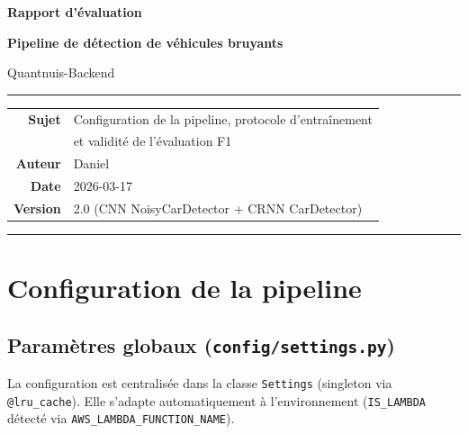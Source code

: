 \documentclass[11pt,a4paper]{article}
\newcommand{\file}[1]{\texttt{\small #1}}
\newcommand{\param}[1]{\texttt{#1}}
\begin{document}
\begin{titlepage}
\centering
\vspace*{3cm}
{\Huge\bfseries\color{sectioncolor} Rapport d'évaluation\par}
\vspace{0.5cm}
{\Large\bfseries Pipeline de détection de véhicules bruyants\par}
\vspace{0.4cm}
{\large\color{accentblue} Quantnuis-Backend\par}
\vspace{2cm}
\rule{0.6\linewidth}{0.8pt}
\vspace{0.5cm}

\begin{center}
\begin{tabular}{rl}
\textbf{Sujet}    & Configuration de la pipeline, protocole d'entraînement \\
                  & et validité de l'évaluation F1 \\[4pt]
\textbf{Auteur}   & Daniel \\[4pt]
\textbf{Date}     & 2026-03-17 \\[4pt]
\textbf{Version}  & 2.0 (CNN NoisyCarDetector + CRNN CarDetector) \\
\end{tabular}
\end{center}

\vspace{2cm}
\rule{0.6\linewidth}{0.4pt}
\end{titlepage}

\tableofcontents
\newpage

\section{Configuration de la pipeline}

\subsection{Paramètres globaux (\file{config/settings.py})}

La configuration est centralisée dans la classe \param{Settings} (singleton via \param{@lru\_cache}).
Elle s'adapte automatiquement à l'environnement (\param{IS\_LAMBDA} détecté via \param{AWS\_LAMBDA\_FUNCTION\_NAME}).
\end{document}
